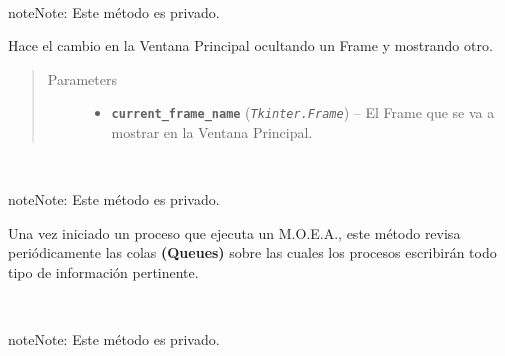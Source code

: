 \documentclass[class=report, crop=false]{standalone}
\begin{document}
\begin{fulllineitems}

\begin{fulllineitems}

~

\begin{notice}{note}{Note:}
Este método es privado.
\end{notice}

Hace el cambio en la Ventana Principal ocultando un 
Frame y mostrando otro.

\begin{quote}\begin{description}
\item[{Parameters}] \leavevmode\begin{itemize}
\item \textbf{\texttt{current\_frame\_name}} (\emph{\texttt{Tkinter.Frame}}) -- El Frame que se va a mostrar en la Ventana Principal.
\end{itemize}
\end{description}\end{quote}

\end{fulllineitems}

\begin{fulllineitems}

~

\begin{notice}{note}{Note:}
Este método es privado.
\end{notice}

Una vez iniciado un proceso que ejecuta un M.O.E.A., este 
método revisa periódicamente las colas \textbf{(Queues)} 
sobre las cuales los procesos escribirán todo tipo de 
información pertinente.

\end{fulllineitems}

\begin{fulllineitems}

~

\begin{notice}{note}{Note:}
Este método es privado.
\end{notice}


\end{fulllineitems}
\end{fulllineitems}
\end{document}
